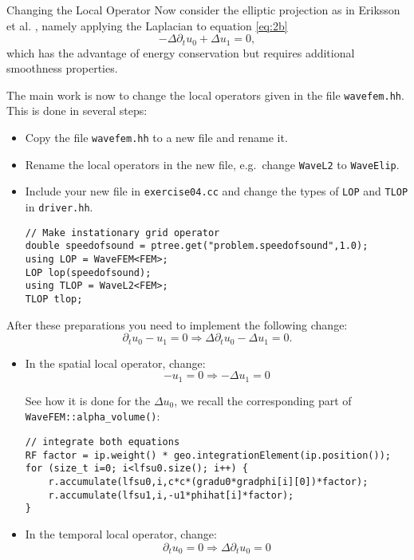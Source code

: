 \documentclass[12pt,a4paper]{article}
\begin{document}
\begin{Exercise}{Changing the Local Operator}
  Now consider the elliptic projection as in Eriksson et
  al. \cite{Eriksson}, namely applying the Laplacian to equation
  \eqref{eq:2b}
  \begin{equation}\label{eq:elip}
    -\Delta \partial_t u_0 + \Delta u_1 = 0,
  \end{equation}
  which has the advantage of energy conservation but requires
  additional smoothness properties.


  The main work is now to change the local operators given in the file
  \lstinline{wavefem.hh}. This is done in several steps:
  \begin{itemize}
  \item Copy the file \lstinline{wavefem.hh} to a new file and rename
    it.
  \item Rename the local operators in the new file, e.g.~change
    \lstinline{WaveL2} to \lstinline{WaveElip}.
  \item Include your new file in \lstinline{exercise04.cc} and change
    the types of \lstinline{LOP} and \lstinline{TLOP} in
    \lstinline{driver.hh}.
  \begin{lstlisting}
// Make instationary grid operator
double speedofsound = ptree.get("problem.speedofsound",1.0);
using LOP = WaveFEM<FEM>;
LOP lop(speedofsound);
using TLOP = WaveL2<FEM>;
TLOP tlop;
  \end{lstlisting}
  \end{itemize}

  After these preparations you need to implement the following change:
  $$ \partial_t u_0 - u_1 = 0 \Rightarrow \Delta \partial_t u_0 -
  \Delta u_1 = 0.$$

  \begin{itemize}
  \item In the spatial local operator, change:
    $$ - u_1 = 0 \Rightarrow -  \Delta u_1 = 0$$

    See how it is done for the $\Delta u_0$, we recall the
    corresponding part of \lstinline{WaveFEM::alpha_volume()}:
  \begin{lstlisting}
// integrate both equations
RF factor = ip.weight() * geo.integrationElement(ip.position());
for (size_t i=0; i<lfsu0.size(); i++) {
	r.accumulate(lfsu0,i,c*c*(gradu0*gradphi[i][0])*factor);
	r.accumulate(lfsu1,i,-u1*phihat[i]*factor);
}
  \end{lstlisting}

  \item In the temporal local operator, change:
    $$ \partial_t u_0  = 0 \Rightarrow \Delta \partial_t u_0= 0$$


\end{itemize}
\end{Exercise}
\end{document}
